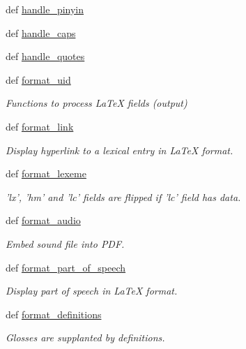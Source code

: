 \begin{DoxyCompactItemize}
\item 
def \hyperlink{namespacelmf_1_1src_1_1output_1_1tex_a888b1a2e247aca19782cd33553a48389}{handle\+\_\+pinyin}
\item 
def \hyperlink{namespacelmf_1_1src_1_1output_1_1tex_a205f4188aa1b342c369855e6e5572a57}{handle\+\_\+caps}
\item 
def \hyperlink{namespacelmf_1_1src_1_1output_1_1tex_ae0c82fed3f85067694b3723e2b22c9dd}{handle\+\_\+quotes}
\item 
def \hyperlink{namespacelmf_1_1src_1_1output_1_1tex_af227fdf99ed78fcc56c1baaacec9ec61}{format\+\_\+uid}
\begin{DoxyCompactList}\small\item\em Functions to process La\+Te\+X fields (output) \end{DoxyCompactList}\item 
def \hyperlink{namespacelmf_1_1src_1_1output_1_1tex_ae7e3e1a360c0c3edf578c6c8e0a0df7f}{format\+\_\+link}
\begin{DoxyCompactList}\small\item\em Display hyperlink to a lexical entry in La\+Te\+X format. \end{DoxyCompactList}\item 
def \hyperlink{namespacelmf_1_1src_1_1output_1_1tex_ad8ae0c7f0968885dbcc879c3750a77cc}{format\+\_\+lexeme}
\begin{DoxyCompactList}\small\item\em 'lx', 'hm' and 'lc' fields are flipped if 'lc' field has data. \end{DoxyCompactList}\item 
def \hyperlink{namespacelmf_1_1src_1_1output_1_1tex_acfa25a92d1341c5aeed086b136377983}{format\+\_\+audio}
\begin{DoxyCompactList}\small\item\em Embed sound file into P\+D\+F. \end{DoxyCompactList}\item 
def \hyperlink{namespacelmf_1_1src_1_1output_1_1tex_a52a7393246f6050a19e672aa205b1570}{format\+\_\+part\+\_\+of\+\_\+speech}
\begin{DoxyCompactList}\small\item\em Display part of speech in La\+Te\+X format. \end{DoxyCompactList}\item 
def \hyperlink{namespacelmf_1_1src_1_1output_1_1tex_aa6cf10b6f99a8a571a00fb22d6797b9a}{format\+\_\+definitions}
\begin{DoxyCompactList}\small\item\em Glosses are supplanted by definitions. \end{DoxyCompactList}\item 

\end{DoxyCompactItemize}
